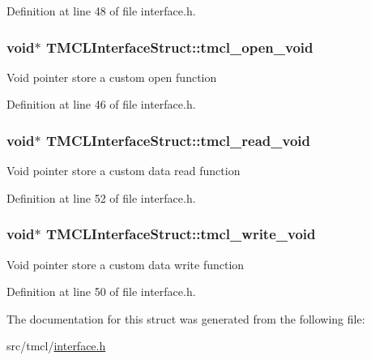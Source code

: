 Definition at line 48 of file interface.h.\hypertarget{structTMCLInterfaceStruct_af15b6916e8874e2276df5953e3c39781}{
\subsubsection[{tmcl\_\-open\_\-void}]{\setlength{\rightskip}{0pt plus 5cm}void$\ast$ {\bf TMCLInterfaceStruct::tmcl\_\-open\_\-void}}}
\label{structTMCLInterfaceStruct_af15b6916e8874e2276df5953e3c39781}
Void pointer store a custom open function 

Definition at line 46 of file interface.h.\hypertarget{structTMCLInterfaceStruct_abaa02120f923776a8b238d45b6ca68b9}{
\subsubsection[{tmcl\_\-read\_\-void}]{\setlength{\rightskip}{0pt plus 5cm}void$\ast$ {\bf TMCLInterfaceStruct::tmcl\_\-read\_\-void}}}
\label{structTMCLInterfaceStruct_abaa02120f923776a8b238d45b6ca68b9}
Void pointer store a custom data read function 

Definition at line 52 of file interface.h.\hypertarget{structTMCLInterfaceStruct_acfb8740deb4a8a5ce6b7882866a93815}{
\subsubsection[{tmcl\_\-write\_\-void}]{\setlength{\rightskip}{0pt plus 5cm}void$\ast$ {\bf TMCLInterfaceStruct::tmcl\_\-write\_\-void}}}
\label{structTMCLInterfaceStruct_acfb8740deb4a8a5ce6b7882866a93815}
Void pointer store a custom data write function 

Definition at line 50 of file interface.h.

The documentation for this struct was generated from the following file:\begin{DoxyCompactItemize}
\item 
src/tmcl/\hyperlink{interface_8h}{interface.h}\end{DoxyCompactItemize}
